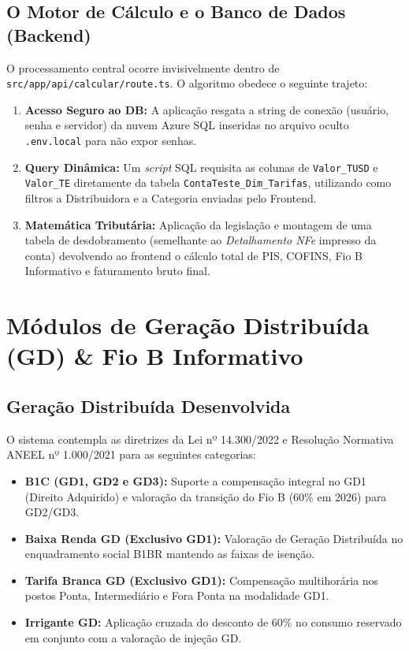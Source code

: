 \documentclass[12pt,a4paper]{article}
\begin{document}
\subsection{O Motor de Cálculo e o Banco de Dados (Backend)}
O processamento central ocorre invisivelmente dentro de \texttt{src/app/api/calcular/route.ts}. O algoritmo obedece o seguinte trajeto:
\begin{enumerate}
    \item \textbf{Acesso Seguro ao DB:} A aplicação resgata a string de conexão (usuário, senha e servidor) da nuvem Azure SQL inseridas no arquivo oculto \texttt{.env.local} para não expor senhas.
    \item \textbf{Query Dinâmica:} Um \textit{script} SQL requisita as colunas de \texttt{Valor\_TUSD} e \texttt{Valor\_TE} diretamente da tabela \texttt{ContaTeste\_Dim\_Tarifas}, utilizando como filtros a Distribuidora e a Categoria enviadas pelo Frontend.
    \item \textbf{Matemática Tributária:} Aplicação da legislação e montagem de uma tabela de desdobramento (semelhante ao \textit{Detalhamento NFe} impresso da conta) devolvendo ao frontend o cálculo total de PIS, COFINS, Fio B Informativo e faturamento bruto final.
\end{enumerate}

\section{Módulos de Geração Distribuída (GD) & Fio B Informativo}

\subsection{Geração Distribuída Desenvolvida}
O sistema contempla as diretrizes da Lei nº 14.300/2022 e Resolução Normativa ANEEL nº 1.000/2021 para as seguintes categorias:
\begin{itemize}
    \item \textbf{B1C (GD1, GD2 e GD3):} Suporte a compensação integral no GD1 (Direito Adquirido) e valoração da transição do Fio B (60\% em 2026) para GD2/GD3.
    \item \textbf{Baixa Renda GD (Exclusivo GD1):} Valoração de Geração Distribuída no enquadramento social B1BR mantendo as faixas de isenção.
    \item \textbf{Tarifa Branca GD (Exclusivo GD1):} Compensação multihorária nos postos Ponta, Intermediário e Fora Ponta na modalidade GD1.
    \item \textbf{Irrigante GD:} Aplicação cruzada do desconto de 60\% no consumo reservado em conjunto com a valoração de injeção GD.
\end{itemize}
\end{document}
